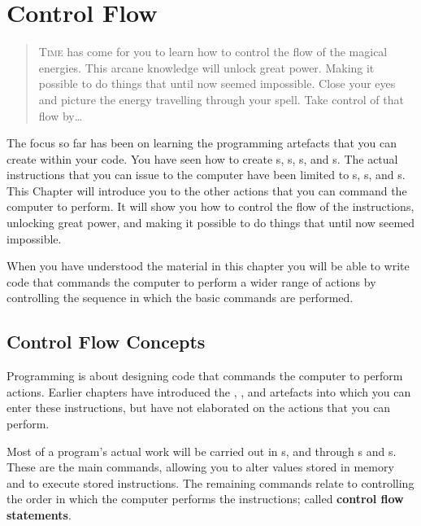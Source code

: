 \chapter{Control Flow} %
\label{cha:control_flow}

\begin{quote}
  \Fontlukas\Large
  \renewcommand{\LettrineTextFont}{\relax}
  \lettrine[image=true,lines=3,lraise=0.1]
  {T}{ime} has come for you to learn how to control the flow of the magical energies. This arcane knowledge will unlock great power. Making it possible to do things that until now seemed impossible. Close your eyes and picture the energy travelling through your spell. Take control of that flow by\ldots
\end{quote}

\bigskip


The focus so far has been on learning the programming artefacts that you can create within your code. You have seen how to create s, s, s, and s. The actual instructions that you can issue to the computer have been limited to s, s, and s. This Chapter will introduce you to the other actions that you can command the computer to perform. It will show you how to control the flow of the instructions, unlocking great power, and making it possible to do things that until now seemed impossible.

When you have understood the material in this chapter you will be able to write code that commands the computer to perform a wider range of actions by controlling the sequence in which the basic commands are performed.

\minitoc

\clearpage
\section{Control Flow Concepts} %
\label{sec:control_flow_concepts}

Programming is about designing code that commands the computer to perform actions. Earlier chapters have introduced the , , and  artefacts into which you can enter these instructions, but have not elaborated on the actions that you can perform.

Most of a program's actual work will be carried out in s, and through s and s. These are the main commands, allowing you to alter values stored in memory and to execute stored instructions. The remaining commands relate to controlling the order in which the computer performs the instructions; called \textbf{control flow statements}.

